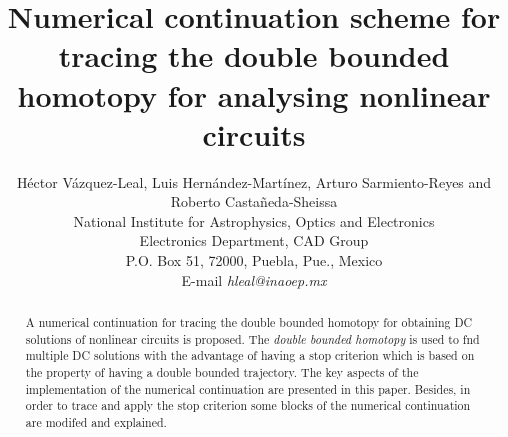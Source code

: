 \documentclass[conference]{IEEEtran}
\begin{document}
\title{Numerical continuation scheme for tracing the double bounded homotopy for analysing  nonlinear circuits}

\author{H\'ector V\'azquez-Leal, Luis Hern\'andez-Mart\'inez, Arturo Sarmiento-Reyes and Roberto Casta\~neda-Sheissa \\ National Institute for Astrophysics, Optics and Electronics\\
Electronics Department, CAD Group\\ P.O. Box 51, 72000, Puebla, Pue., Mexico \\ E-mail {\it  hleal@inaoep.mx}}




% 




\maketitle



\begin{abstract}
A numerical continuation for tracing the double bounded homotopy for obtaining  DC solutions of 
nonlinear circuits is proposed.
The {\it double bounded homotopy} is used  to fnd multiple DC solutions 
with the advantage of having
a stop criterion  which is based on the property of having a double bounded trajectory. 
The key aspects of the implementation of the numerical continuation are presented in this paper. Besides, in order to
trace and apply the stop criterion some blocks of the numerical continuation are modifed and explained.
\end{abstract}
\end{document}
